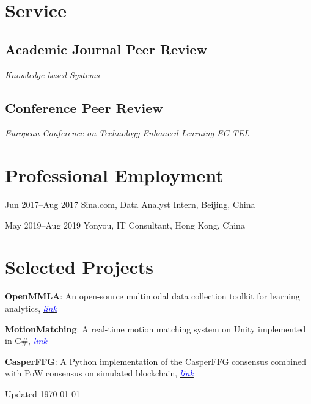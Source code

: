 \documentclass[11pt,letterpaper]{report}
\newcommand{\listitemspace}{0.25em}
\renewenvironment{itemize}
{\begin{list}{}{\setlength{\leftmargin}{0em}
                \setlength{\parskip}{0em}
                \setlength{\itemsep}{\listitemspace}
                \setlength{\parsep}{\listitemspace}}}
{\end{list}}
\begin{document}
    \section*{Service}

    \subsection*{Academic Journal Peer Review}

    \begin{itemize}

        \item \textit{Knowledge-based Systems}

    \end{itemize}

    \subsection*{Conference Peer Review}

    \begin{itemize}

        \item \textit{European Conference on Technology-Enhanced Learning EC-TEL}

    \end{itemize}


    \section*{Professional Employment}

    \begin{tablist}

        \item[Jun 2017--Aug 2017] \tab{}Sina.com, Data Analyst Intern, Beijing, China
        \item[May 2019--Aug 2019] \tab{}Yonyou, IT Consultant, Hong Kong, China
        
    \end{tablist}

    \section*{Selected Projects}

    \begin{itemize}

        \item \textbf{OpenMMLA}: An open-source multimodal data collection toolkit for learning analytics, \href{https://github.com/ucph-ccs/OpenMMLA}{\textcolor{blue}{\textit{link}}}
        \item \textbf{MotionMatching}: A real-time motion matching system on Unity implemented in C\#, \href{https://github.com/lizaibeim/motion-matching}{\textcolor{blue}{\textit{link}}}
        \item \textbf{CasperFFG}: A Python implementation of the CasperFFG consensus combined with PoW consensus on simulated blockchain, \href{https://github.com/lizaibeim/casper-ffg}{\textcolor{blue}{\textit{link}}}

    \end{itemize}


    \begin{center}
        \vfill
        Updated \monthyeardate\today
    \end{center}
\end{document}

